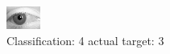 \begin{figure}[h!]
\begin{center}
\includegraphics[width=0.60\columnwidth]{figures/ID2826_class_4_target_3.png}
\end{center}
\caption{ Classification: 4 actual target: 3}
\label{fig:ID2826_class_4_target_3}
\end{figure}
